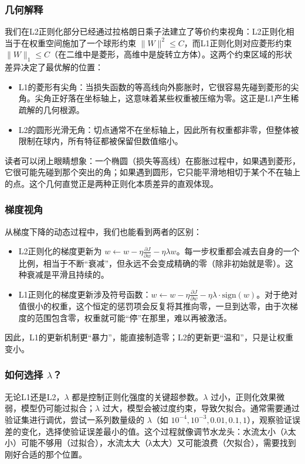 \documentclass[lang=cn,zihao=-4,a4paper,fontset=windows]{beautybook}
\renewcommand{\partial}{∂}
\begin{document}
\subsubsection*{几何解释}

我们在L2正则化部分已经通过拉格朗日乘子法建立了等价约束视角：L2正则化相当于在权重空间施加了一个球形约束 \(\|W\|^2 \le C\)，而L1正则化则对应菱形约束 \(\|W\|_1 \le C\)（在二维中是菱形，高维中是旋转立方体）。这两个约束区域的形状差异决定了最优解的位置：
\begin{itemize}
\item L1的菱形有尖角：当损失函数的等高线向外膨胀时，它很容易先碰到菱形的尖角。尖角正好落在坐标轴上，这意味着某些权重被压缩为零。这正是L1产生稀疏解的几何根源。
\item L2的圆形光滑无角：切点通常不在坐标轴上，因此所有权重都非零，但整体被限制在球内，所有特征都被保留但数值缩小。
\end{itemize}
读者可以闭上眼睛想象：一个椭圆（损失等高线）在膨胀过程中，如果遇到菱形，它很可能先碰到那个突出的角；如果遇到圆形，它只能平滑地相切于某个不在轴上的点。这个几何直觉正是两种正则化本质差异的直观体现。

\subsubsection*{梯度视角}

从梯度下降的动态过程中，我们也能看到两者的区别：
\begin{itemize}
\item L2正则化的梯度更新为 \(w \leftarrow w - \eta \frac{\partial J}{\partial w} - \eta \lambda w\)。每一步权重都会减去自身的一个比例，相当于不断“衰减”，但永远不会变成精确的零（除非初始就是零）。这种衰减是平滑且持续的。
\item L1正则化的梯度更新涉及符号函数：\(w \leftarrow w - \eta \frac{\partial J}{\partial w} - \eta \lambda \cdot \text{sign}(w)\)。对于绝对值很小的权重，这个恒定的惩罚项会反复将其推向零，一旦到达零，由于次梯度的范围包含零，权重就可能“停”在那里，难以再被激活。
\end{itemize}
因此，L1的更新机制更“暴力”，能直接制造零；L2的更新更“温和”，只是让权重变小。

\subsubsection*{如何选择 \(\lambda\)？}

无论L1还是L2，\(\lambda\) 都是控制正则化强度的关键超参数。\(\lambda\) 过小，正则化效果微弱，模型仍可能过拟合；\(\lambda\) 过大，模型会被过度约束，导致欠拟合。通常需要通过验证集进行调优，尝试一系列数量级的 \(\lambda\)（如 \(10^{-4}, 10^{-3}, 0.01, 0.1, 1\)），观察验证误差的变化，选择使验证误差最小的值。这个过程就像调节水龙头：水流太小（λ太小）可能不够用（过拟合），水流太大（λ太大）又可能浪费（欠拟合），需要找到刚好合适的那个位置。
\end{document}
